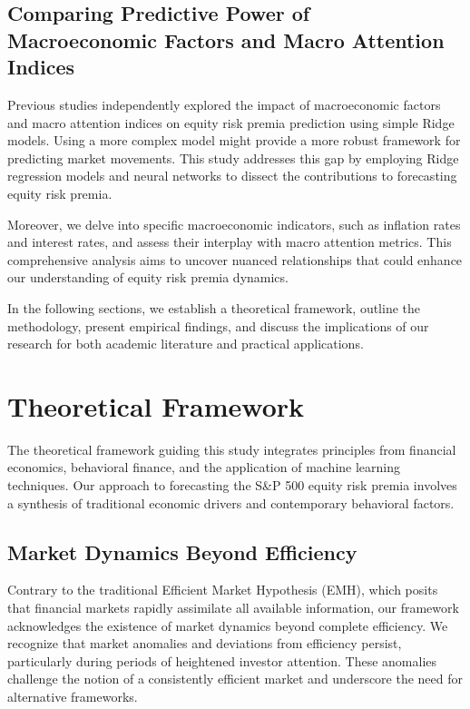 \documentclass{article}
\begin{document}
\subsection{Comparing Predictive Power of Macroeconomic Factors and Macro Attention Indices}

Previous studies independently explored the impact of macroeconomic factors and macro attention indices on equity risk premia prediction using simple Ridge models. Using a more complex model might provide a more robust framework for predicting market movements. This study addresses this gap by employing Ridge regression models and neural networks to dissect the contributions to forecasting equity risk premia.

Moreover, we delve into specific macroeconomic indicators, such as inflation rates and interest rates, and assess their interplay with macro attention metrics. This comprehensive analysis aims to uncover nuanced relationships that could enhance our understanding of equity risk premia dynamics.

In the following sections, we establish a theoretical framework, outline the methodology, present empirical findings, and discuss the implications of our research for both academic literature and practical applications.

\section{Theoretical Framework}

The theoretical framework guiding this study integrates principles from financial economics, behavioral finance, and the application of machine learning techniques. Our approach to forecasting the S\&P 500 equity risk premia involves a synthesis of traditional economic drivers and contemporary behavioral factors.

\subsection{Market Dynamics Beyond Efficiency}

Contrary to the traditional Efficient Market Hypothesis (EMH), which posits that financial markets rapidly assimilate all available information, our framework acknowledges the existence of market dynamics beyond complete efficiency. We recognize that market anomalies and deviations from efficiency persist, particularly during periods of heightened investor attention. These anomalies challenge the notion of a consistently efficient market and underscore the need for alternative frameworks.
\end{document}
